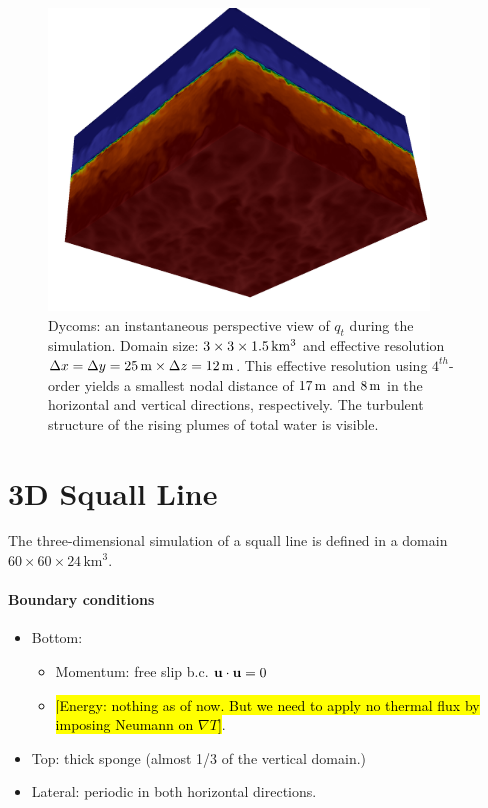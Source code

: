 \documentclass{report}
\begin{document}
\begin{figure}
    \centering
        \includegraphics[width=0.9\textwidth]{./figures/benchmarks/dycoms/qtot0060.png}
	\caption{Dycoms: an instantaneous perspective view of $q_t$ during the simulation. Domain size: $3 \times 3 \times 1.5\,{\rm km^3}$ and effective resolution $\Delta x = \Delta y = 25\,{\rm m} \times \Delta z = 12\,{\rm m}$. This effective resolution using $4^{th}$-order  yields a smallest nodal distance of $17\,{\rm m}$ and $8\,{\rm m}$ in the horizontal and vertical directions, respectively. The turbulent structure of the rising plumes of total water is visible. }
	\label{fig:DYCOMS_qt_contours}
\end{figure}

\section{3D Squall Line}
\label{sq3D}
The three-dimensional simulation of a squall line is defined in a domain
$60\times 60\times24\,\mathrm{km}^3$. 

\paragraph{Boundary conditions}
\begin{itemize}
\item Bottom:
    \begin{itemize}
        \item Momentum: free slip b.c. ${\bf u}\cdot{\bf u}= 0$
        \item \hl{[Energy: nothing as of now. But we need to apply no thermal flux by imposing Neumann on $\nabla T$]}.
    \end{itemize}
\item Top: thick sponge (almost 1/3 of the vertical domain.)
\item Lateral: periodic in both horizontal directions.
\end{itemize}
\end{document}
